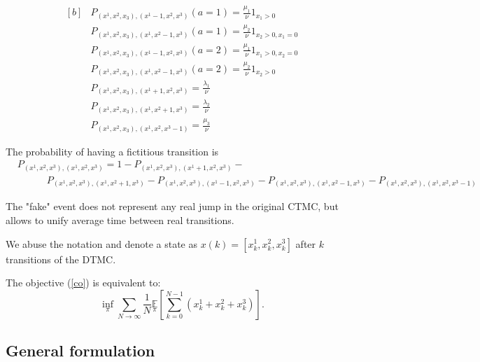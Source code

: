 \documentclass[11pt]{article}
\newcommand{\E}{\mathbb{E}}
\theoremstyle{definition}
\numberwithin{equation}{section}
\begin{document}
\begin{equation}\label{eq:pr}
        \begin{aligned}[b]
&P_{(x^1, x^2, x_3),(x^1-1, x^2, x^3) }(a=1) = \frac{\mu_1}{\nu}1_{x_1>0}\\
&P_{(x^1, x^2, x_3),(x^1, x^2-1, x^3) }(a=1) = \frac{\mu_2}{\nu}1_{x_2>0, x_1=0}\\
&P_{(x^1, x^2, x_3),(x^1-1, x^2, x^3) }(a=2) = \frac{\mu_1}{\nu}1_{x_1>0, x_2=0}\\
&P_{(x^1, x^2, x_3),(x^1, x^2-1, x^3) }(a=2) = \frac{\mu_2}{\nu}1_{x_2>0}\\
&P_{(x^1, x^2, x_3),(x^1+1, x^2, x^3) } = \frac{\lambda_1}{\nu}\\
&P_{(x^1, x^2, x_3),(x^1, x^2+1, x^3) } = \frac{\lambda_2}{\nu}\\
&P_{(x^1, x^2, x_3),(x^1, x^2, x^3-1) } = \frac{\mu_3}{\nu}
        \end{aligned}
\end{equation}

The probability of having a fictitious transition is
\begin{align*}
&P_{(x^1, x^2, x^3),(x^1, x^2, x^3) } = 1 - P_{(x^1, x^2, x^3),(x^1+1, x^2, x^3) } - \\
&\quad\quad\quad P_{(x^1, x^2, x^3),(x^1, x^2+1, x^3) } - P_{(x^1, x^2, x^3),(x^1-1, x^2, x^3) } - P_{(x^1, x^2, x^3),(x^1, x^2-1, x^3) }-P_{(x^1, x^2, x^3),(x^1, x^2, x^3-1) }
\end{align*}

The "fake" event  does not
represent any real jump in the original CTMC, but allows to unify average time between real
transitions.

We abuse the notation and denote a state  as $x(k) = [x^1_k, x^2_k, x^3_k]$ after $k$ transitions of the DTMC.


The objective (\ref{co}) is equivalent to:
\begin{equation}\inf\limits_{\pi} \sum\limits_{N\rightarrow \infty}\frac{1}{N}\underset{\pi}{\E}\left[ \sum\limits_{k=0}^{N-1}(x^1_k+x^2_k+x^3_k)\right].\end{equation}





\subsection{General formulation}
\end{document}
